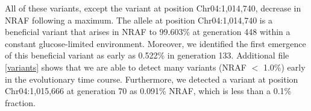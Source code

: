 \documentclass{bmcart}
\begin{document}



All of these variants, except the variant at position Chr04:1,014,740, decrease in NRAF following a maximum.
The allele at position Chr04:1,014,740 is a beneficial variant that arises in NRAF to 99.603\% at generation 448 within a constant glucose-limited environment.
Moreover, we identified the first emergence of this beneficial variant as early as 0.522\% in generation 133.
Additional file \ref{variants} shows that we are able to detect many variants (NRAF $<$ 1.0\%) early in the evolutionary time course.
Furthermore, we detected a variant at position Chr04:1,015,666 at generation 70 as 0.091\% NRAF, which is less than a 0.1\% fraction.

\end{document}
